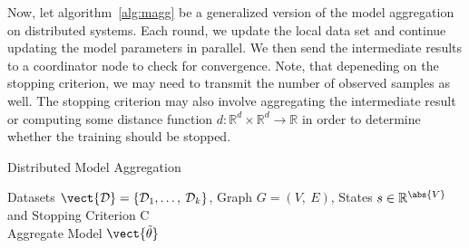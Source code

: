Now, let algorithm~\ref{alg:magg} be a generalized version of the model aggregation on distributed systems. 
Each round, we update the local data set and continue updating the model parameters in parallel. 
We then send the intermediate results to a coordinator node to check for convergence.
Note, that depeneding on the stopping criterion, we may need to transmit the number of observed samples as well. 
The stopping criterion may also involve aggregating the intermediate result or computing some distance function $d: \mathbb{R}^d \times \mathbb{R}^d  \rightarrow \mathbb{R}$ in order to determine whether the training should be stopped.
\begin{algo}{Distributed Model Aggregation}
    \begin{algorithm}[H]
    \caption{Distributed Learning}
        \begin{algorithmic}[1]
            \label{alg:magg}
            \REQUIRE Datasets $\mathcal{\vect{D}} = \{\mathcal{D}_1, \ldots,\: \mathcal{D}_k\}$, Graph $G=(V,\:E)$, States $s \in \mathbb{R}^{\abs{V}}$ and Stopping Criterion C \\
            \ENSURE Aggregate Model $\vect{\tilde{\theta}}$  \\
             \\
             \\
                 \\
            \ENDIF
            \ENDWHILE
            \ENDFOR
            \\
            \RETURN {$\vect{\tilde{\theta}}$}
        \end{algorithmic}
    \end{algorithm}
\end{algo}


